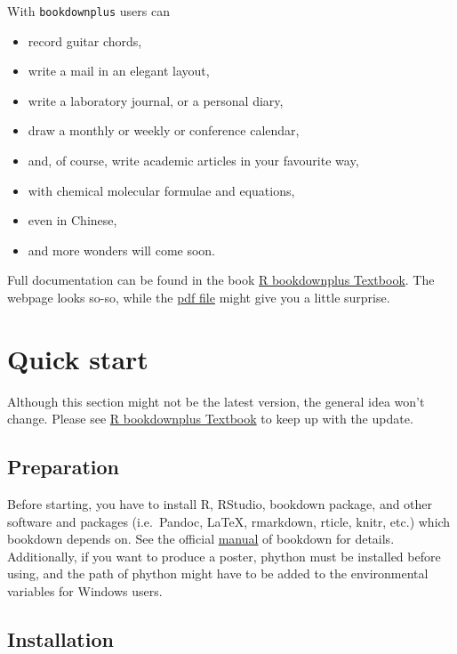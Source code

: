 \documentclass[bgd, online, hvmath]{style/copernicus}
\begin{document}
With \texttt{bookdownplus} users can

\begin{itemize}
\item
  record guitar chords,
\item
  write a mail in an elegant layout,
\item
  write a laboratory journal, or a personal diary,
\item
  draw a monthly or weekly or conference calendar,
\item
  and, of course, write academic articles in your favourite way,
\item
  with chemical molecular formulae and equations,
\item
  even in Chinese,
\item
  and more wonders will come soon.
\end{itemize}

Full documentation can be found in the book
\href{https://bookdown.org/baydap/bookdownplus}{R bookdownplus
Textbook}. The webpage looks so-so, while the
\href{https://bookdown.org/baydap/bookdownplus/bookdownplus.pdf}{pdf
file} might give you a little surprise.

\section{Quick start}\label{quick-start}

Although this section might not be the latest version, the general idea
won't change. Please see
\href{https://bookdown.org/baydap/bookdownplus}{R bookdownplus Textbook}
to keep up with the update.

\subsection{Preparation}\label{preparation}

Before starting, you have to install R, RStudio, bookdown package, and
other software and packages (i.e.~Pandoc, LaTeX, rmarkdown, rticle,
knitr, etc.) which bookdown depends on. See the official
\href{https://bookdown.org/yihui/bookdown/}{manual} of bookdown for
details. Additionally, if you want to produce a poster, phython must be
installed before using, and the path of phython might have to be added
to the environmental variables for Windows users.

\subsection{Installation}\label{installation}
\end{document}
